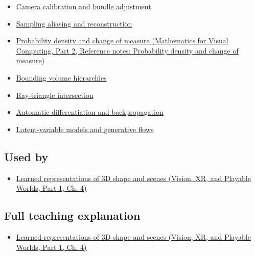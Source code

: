 \hypertarget{appendix-c5b332e400e7-prerequisites}{}

\begin{itemize}
\tightlist
\item
  \hyperref[appendix-3ee9861904d5]{Camera calibration and bundle adjustment}
\item
  \hyperref[appendix-6a7869dd79a6]{Sampling aliasing and reconstruction}
\item
  \href{../02-Mathematics-for-Visual-Computing-P02/main.pdf\#nameddest=appendix-4815cd87ab8b}{Probability density and change of measure (Mathematics for Visual Computing, Part 2, Reference notes: Probability density and change of measure)}
\item
  \hyperref[appendix-0b426c47dd78]{Bounding volume hierarchies}
\item
  \hyperref[appendix-47ac1bd6d144]{Ray-triangle intersection}
\item
  \hyperref[appendix-40df0855b4a7]{Automatic differentiation and backpropagation}
\item
  \hyperref[appendix-2c568f05ee34]{Latent-variable models and generative flows}
\end{itemize}

\subsection{Used by}\label{appendix-c5b332e400e7-used-by}

\hypertarget{appendix-c5b332e400e7-used-by}{}

\begin{itemize}
\tightlist
\item
  \href{../07-Vision-XR-and-Playable-Worlds-P01/main.pdf\#nameddest=04-visual-computing-ii-ch034-learned-representations-of-3d-shape-and-scenes}{Learned representations of 3D shape and scenes (Vision, XR, and Playable Worlds, Part 1, Ch. 4)}
\end{itemize}

\subsection{Full teaching explanation}\label{appendix-c5b332e400e7-full-teaching-explanation}

\hypertarget{appendix-c5b332e400e7-full-teaching-explanation}{}

\begin{itemize}
\tightlist
\item
  \href{../07-Vision-XR-and-Playable-Worlds-P01/main.pdf\#nameddest=04-visual-computing-ii-ch034-learned-representations-of-3d-shape-and-scenes}{Learned representations of 3D shape and scenes (Vision, XR, and Playable Worlds, Part 1, Ch. 4)}
\end{itemize}


